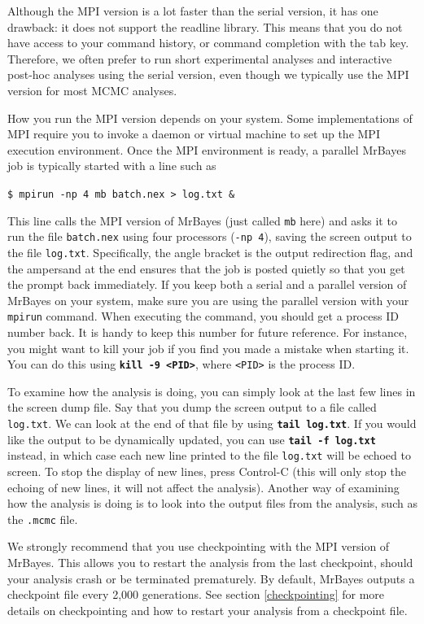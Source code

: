 \documentclass[12pt]{book}
\newcommand{\ttt}[1]{\texttt{#1}}
\newcommand{\tb}[1]{\ttt{\textbf{#1}}}
\begin{document}
Although the MPI version is a lot faster than the serial version, it has one drawback: it does not
support the readline library. This means that you do not have access to your command history, or
command completion with the tab key. Therefore, we often prefer to run short experimental analyses
and interactive post-hoc analyses using the serial version, even though we typically use the MPI
version for most MCMC analyses.

How you run the MPI version depends on your system. Some implementations of MPI require you to
invoke a daemon or virtual machine to set up the MPI execution environment. Once the MPI
environment is ready, a parallel MrBayes job is typically started with a line such as

\ttt{\$ mpirun -np 4 mb batch.nex > log.txt \&}

This line calls the MPI version of MrBayes (just called \ttt{mb} here) and asks it to run the file
\ttt{batch.nex} using four processors (\ttt{-np 4}), saving the screen output to the file
\ttt{log.txt}. Specifically, the angle bracket is the output redirection flag, and the ampersand at
the end ensures that the job is posted quietly so that you get the prompt back immediately. If you
keep both a serial and a parallel version of MrBayes on your system, make sure you are using the
parallel version with your \ttt{mpirun} command. When executing the command, you should get a
process ID number back. It is handy to keep this number for future reference. For instance, you
might want to kill your job if you find you made a mistake when starting it. You can do this using
\tb{kill -9 <PID>}, where \ttt{<PID>} is the process ID.

To examine how the analysis is doing, you can simply look at the last few lines in the screen dump
file. Say that you dump the screen output to a file called \ttt{log.txt}. We can look at the end of
that file by using \tb{tail log.txt}. If you would like the output to be dynamically updated, you
can use \tb{tail -f log.txt} instead, in which case each new line printed to the file \ttt{log.txt}
will be echoed to screen. To stop the display of new lines, press Control-C (this will only stop
the echoing of new lines, it will not affect the analysis). Another way of examining how the
analysis is doing is to look into the output files from the analysis, such as the \ttt{.mcmc} file.

We strongly recommend that you use checkpointing with the MPI version of MrBayes. This allows you
to restart the analysis from the last checkpoint, should your analysis crash or be terminated
prematurely. By default, MrBayes outputs a checkpoint file every 2,000 generations. See section
\ref{checkpointing} for more details on checkpointing and how to restart your analysis from a
checkpoint file.
\end{document}
